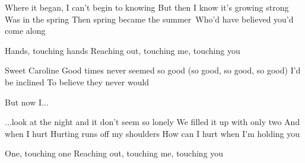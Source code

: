 \begin{verse*}
Where it began, I can't begin to knowing
But then I know it's growing strong
Was in the spring
Then spring became the summer\
Who'd have believed you'd come along
\end{verse*}

\begin{verse*}
Hands, touching hands
Reaching out, touching me, touching you
\end{verse*}

\begin{chorus}
Sweet Caroline
Good times never seemed so good (so good, so good, so good)
I'd be inclined
To believe they never would
\end{chorus}

\begin{verse*}
But now I...
\end{verse*}

\begin{verse*}
...look at the night and it don't seem so lonely
We filled it up with only two
And when I hurt
Hurting runs off my shoulders
How can I hurt when I'm holding you
\end{verse*}

\begin{verse*}
One, touching one
Reaching out, touching me, touching you
\end{verse*}

\thechorus[2]
